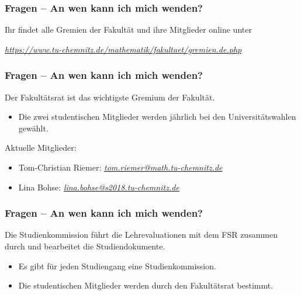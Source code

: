 \documentclass[10pt]{beamer}
\begin{document}
\begin{frame}
	\frametitle{Fragen -- An wen kann ich mich wenden?}

	Ihr findet alle Gremien der Fakultät und ihre Mitglieder online unter 

	\vspace*{1.0cm}

	\begin{center}
		\textit{\href{https://www.tu-chemnitz.de/mathematik/fakultaet/gremien.de.php}{https://www.tu-chemnitz.de/mathematik/fakultaet/gremien.de.php}}
	\end{center}
\end{frame}

\begin{frame}
	\frametitle{Fragen -- An wen kann ich mich wenden?}

	\begin{block}{\vphantom{X}}
		Der Fakultätsrat ist das wichtigste Gremium der Fakultät.
	\end{block}

	\begin{itemize}
		\item Die zwei studentischen Mitglieder werden jährlich bei den Universitätswahlen gewählt.
	\end{itemize} 

	\vspace*{1.0cm}

	Aktuelle Mitglieder:

	\begin{itemize}
		\item Tom-Christian Riemer: \textit{\href{mailto:tom.riemer@math.tu-chemnitz.de}{tom.riemer@math.tu-chemnitz.de}}
		\item Lina Bohse: \textit{\href{mailto:lina.bohse@s2018.tu-chemnitz.de}{lina.bohse@s2018.tu-chemnitz.de}}   
	\end{itemize}
\end{frame}

\begin{frame}
	\frametitle{Fragen -- An wen kann ich mich wenden?}

	\begin{block}{\vphantom{X}}
		Die Studienkommission führt die Lehrevaluationen mit dem FSR zusammen durch und bearbeitet die Studiendokumente.
	\end{block}

	\begin{itemize}
		\item Es gibt für jeden Studiengang eine Studienkommission.
		\item Die studentischen Mitglieder werden durch den Fakultätsrat bestimmt.
	\end{itemize}
\end{frame}
\end{document}
